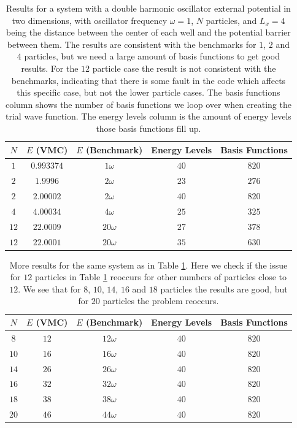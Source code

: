 \documentclass[../main.tex]{subfiles}
\begin{document}
\begin{table}[!ht]
  \centering
  \begin{tabular}{ | c | c | c | c | c | }
    \hline
    $N$ & $E$ (VMC) & $E$ (Benchmark) &  Energy Levels & Basis Functions\\*
    \hline
    $1$ & $0.993374$ & $1\omega$ & $40$ & $820$ \\*
    \hline
    $2$ & $1.9996$ & $2\omega$ & $23$ & $276$ \\*
    \hline
    $2$ & $2.00002$ & $2\omega$ & $40$ & $820$ \\*
    \hline
    $4$ & $4.00034$ & $4\omega$ & $25$ & $325$ \\*
    \hline
    $12$ & $22.0009$ & $20\omega$ & $27$ & $378$ \\*
    \hline
    $12$ & $22.0001$ & $20\omega$ & $35$ & $630$ \\*
    \hline
  \end{tabular}
  \caption{Results for a system with a double harmonic oscillator external potential in two dimensions, with oscillator frequency $\omega = 1$, $N$ particles, and $L_x = 4$ being the distance between the center of each well and the potential barrier between them. The results are consistent with the benchmarks for $1$, $2$ and $4$ particles, but we need a large amount of basis functions to get good results. For the $12$ particle case the result is not consistent with the benchmarks, indicating that there is some fault in the code which affects this specific case, but not the lower particle cases. The basis functions column shows the number of basis functions we loop over when creating the trial wave function. The energy levels column is the amount of energy levels those basis functions fill up.}
  \label{tab:DoubleHOTest2D}
\end{table}

\begin{table}[!ht]
  \centering
  \begin{tabular}{ | c | c | c | c | c | }
    \hline
    $N$ & $E$ (VMC) & $E$ (Benchmark) &  Energy Levels & Basis Functions\\*
    \hline
    $8$ & $12$ & $12\omega$ & $40$ & $820$ \\*
    \hline
    $10$ & $16$ & $16\omega$ & $40$ & $820$ \\*
    \hline
    $14$ & $26$ & $26\omega$ & $40$ & $820$ \\*
    \hline
    $16$ & $32$ & $32\omega$ & $40$ & $820$ \\*
    \hline
    $18$ & $38$ & $38\omega$ & $40$ & $820$ \\*
    \hline
    $20$ & $46$ & $44\omega$ & $40$ & $820$ \\*
    \hline
  \end{tabular}
  \caption{More results for the same system as in Table \ref{tab:DoubleHOTest2D}. Here we check if the issue for $12$ particles in Table \ref{tab:DoubleHOTest2D} reoccurs for other numbers of particles close to $12$. We see that for $8$, $10$, $14$, $16$ and $18$ particles the results are good, but for $20$ particles the problem reoccurs.}
  \label{tab:DoubleHOTest2DExtended}
\end{table}
\end{document}
